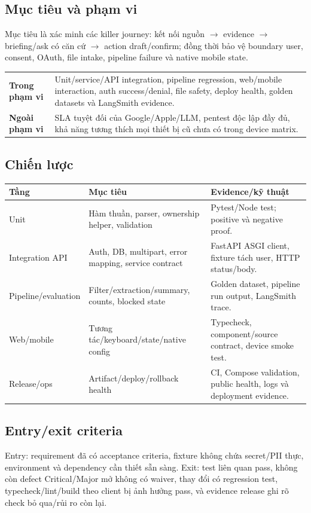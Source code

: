 \documentclass[11pt,a4paper]{article}
\begin{document}
\subsection{Mục tiêu và phạm vi}
Mục tiêu là xác minh các killer journey: kết nối nguồn $\rightarrow$ evidence $\rightarrow$ briefing/ask có căn cứ $\rightarrow$ action draft/confirm; đồng thời bảo vệ boundary user, consent, OAuth, file intake, pipeline failure và native mobile state.

\begin{tabularx}{\textwidth}{>{\bfseries}p{3.1cm}X}
\toprule Trong phạm vi & Unit/service/API integration, pipeline regression, web/mobile interaction, auth success/denial, file safety, deploy health, golden datasets và LangSmith evidence. \\
Ngoài phạm vi & SLA tuyệt đối của Google/Apple/LLM, pentest độc lập đầy đủ, khả năng tương thích mọi thiết bị cũ chưa có trong device matrix. \\
\bottomrule
\end{tabularx}

\subsection{Chiến lược}
\begin{longtable}{p{3cm}p{4cm}p{7cm}}
\toprule Tầng & Mục tiêu & Evidence/kỹ thuật \\ \midrule\endhead
Unit & Hàm thuần, parser, ownership helper, validation & Pytest/Node test; positive và negative proof. \\
Integration API & Auth, DB, multipart, error mapping, service contract & FastAPI ASGI client, fixture tách user, HTTP status/body. \\
Pipeline/evaluation & Filter/extraction/summary, counts, blocked state & Golden dataset, pipeline run output, LangSmith trace. \\
Web/mobile & Tương tác/keyboard/state/native config & Typecheck, component/source contract, device smoke test. \\
Release/ops & Artifact/deploy/rollback health & CI, Compose validation, public health, logs và deployment evidence. \\
\bottomrule
\end{longtable}

\subsection{Entry/exit criteria}
Entry: requirement đã có acceptance criteria, fixture không chứa secret/PII thực, environment và dependency cần thiết sẵn sàng. Exit: test liên quan pass, không còn defect Critical/Major mở không có waiver, thay đổi có regression test, typecheck/lint/build theo client bị ảnh hưởng pass, và evidence release ghi rõ check bỏ qua/rủi ro còn lại.
\end{document}
